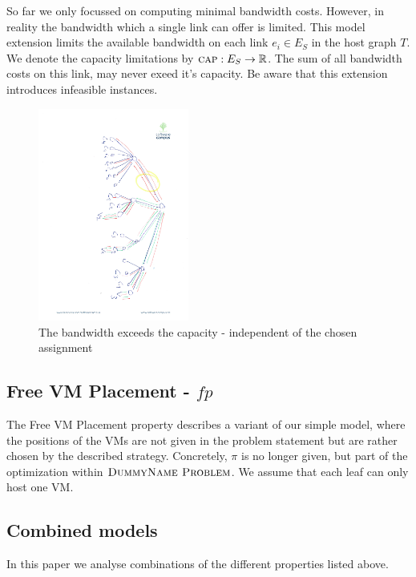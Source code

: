\documentclass[9pt,twocolumn]{scrartcl}
\newcommand{\Capacity}{\ensuremath{\textsc{cap}}}
\newcommand{\Problem}{\textsc{DummyName Problem}}
\newcommand{\NodeMapping}{\pi}
\newcommand{\SubstrateEdges}{\ensuremath{E_S}}
\newcommand{\SubstrateEdge}{\ensuremath{e}}
\newcommand{\Tree}{\ensuremath{T}}
\begin{document}
\begin{appendix}
So far we only focussed on computing minimal bandwidth costs. However, in
reality the bandwidth which a single link can offer is limited. This model
extension limits the available bandwidth on each link $\SubstrateEdge_i \in
\SubstrateEdges$ in the host graph $\Tree$. We denote the capacity limitations
by $\Capacity : \SubstrateEdges \rightarrow \mathbb{R}$. The sum of all
bandwidth costs on this link, may never exeed it's capacity. Be aware that
this extension introduces infeasible instances.

\begin{figure}

\includegraphics[angle=90,origin=c, height=7cm]{figs/model_fig_skteches/bw_ma_r_cv}
\caption{The bandwidth exceeds the capacity - independent of the chosen assignment}
\end{figure}
\subsection{Free VM Placement - $fp$}

The Free VM Placement property describes a variant of our simple model, where
the positions of the VMs are not given in the problem statement but are
rather chosen by the described strategy. Concretely, $\NodeMapping$ is no
longer given, but part of the optimization within $\Problem$. We assume that
each leaf can only host one VM.

\subsection{Combined models} In this paper we analyse combinations of the
different properties listed above.


\end{appendix}
\end{document}
